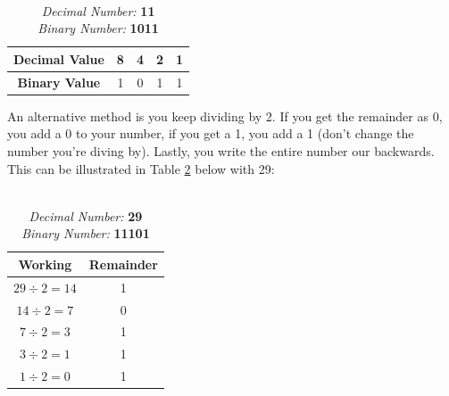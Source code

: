 \documentclass[12pt,a4paper]{book}
\begin{document}
				\begin{table}[H]
					\centering
					\label{tab:binary2}
					\begin{tabular}{c||c|c|c|c|}
						\textbf{Decimal Value} & 8 & 4 & 2 & 1 \\
						\hline
						\textbf{Binary Value} & 1 & 0 & 1 & 1 \\
					\end{tabular}
				\caption{ \\
					\textit{Decimal Number:} \textbf{11} \\ \textit{Binary Number:} \textbf{1011}}
				\end{table}	
				
				An alternative method is you keep dividing by 2. If you get the remainder as 0, you add a 0 to your number, if you get a 1, you add a 1 (don't change the number you're diving by). Lastly, you write the entire number our backwards. This can be illustrated in Table \ref{tab:binary3} below with 29:
				\begin{table}[H]
					\centering
					\label{tab:binary3}
					\begin{tabular}{c|c}
						\textbf{Working} & \textbf{Remainder} \\
						\hline
						$29\div2=14$ & 1 \\
						$14\div2=7$ & 0 \\
						$7\div2=3$ & 1 \\
						$3\div2=1$ & 1 \\
						$1\div2=0$ & 1 \\
					\end{tabular}
					\caption{ \\
						\textit{Decimal Number:} \textbf{29} \\ \textit{Binary Number:} \textbf{11101}}
				\end{table}	
				
\end{document}
